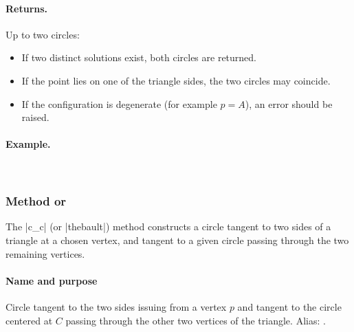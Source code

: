 \medskip
\noindent
\paragraph{Returns.}
Up to two circles:
\begin{itemize}
  \item If two distinct solutions exist, both circles are returned.
  \item If the point lies on one of the triangle sides, the two circles may coincide.
  \item If the configuration is degenerate (for example \(p=A\)), an error should be raised.
\end{itemize}

\medskip
\noindent
\paragraph{Example.}\mbox{}\\

\vspace{1em}


\begin{tkzexample}[latex=.5\textwidth]
\begin{center}
\end{center}
\end{tkzexample}


\subsubsection{Method  or  }
\label{ssub:method_triangle_c_c}

The |c_c| (or |thebault|) method constructs a circle tangent to two sides of a triangle at a chosen vertex, and tangent to a given circle passing through the two remaining vertices.


\paragraph*{Name and purpose}
Circle tangent to the two sides issuing from a vertex $p$ and tangent to the circle centered at $C$ passing through the other two vertices of the triangle.
Alias: .

